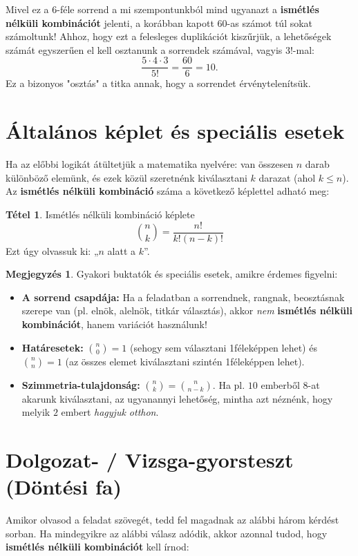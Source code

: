 \documentclass[a4paper,12pt]{article}
\theoremstyle{definition} %
\newtheorem*{theorem}{Tétel}
\newtheorem*{remark}{\mytriangle{bvred} Megjegyzés}
\begin{document}
Mivel ez a $6$-féle sorrend a mi szempontunkból mind ugyanazt a \textbf{ismétlés nélküli kombinációt} jelenti, a korábban kapott $60$-as számot túl sokat számoltunk! Ahhoz, hogy ezt a felesleges duplikációt kiszűrjük, a lehetőségek számát egyszerűen el kell osztanunk a sorrendek számával, vagyis $3!$-mal:
$$\frac{5 \cdot 4 \cdot 3}{5!} = \frac{60}{6} = 10.$$
Ez a bizonyos "osztás" a titka annak, hogy a sorrendet érvénytelenítsük.

\section{Általános képlet és speciális esetek}
Ha az előbbi logikát átültetjük a matematika nyelvére: van összesen $n$ darab különböző elemünk, és ezek közül szeretnénk kiválasztani $k$ darazat (ahol $k \le n$). Az \textbf{ismétlés nélküli kombináció} száma a következő képlettel adható meg:

\begin{theorem}{Ismétlés nélküli kombináció képlete}
$$\binom{n}{k} = \frac{n!}{k!(n-k)!}$$
Ezt úgy olvassuk ki: „$n$ alatt a $k$”.
\end{theorem}

\begin{remark}
Gyakori buktatók és speciális esetek, amikre érdemes figyelni:
\begin{itemize}
    \item \textbf{A sorrend csapdája:} Ha a feladatban a sorrendnek, rangnak, beosztásnak szerepe van (pl. elnök, alelnök, titkár választás), akkor \textit{nem} \textbf{ismétlés nélküli kombinációt}, hanem variációt használunk!
    \item \textbf{Határesetek:} $\binom{n}{0} = 1$ (sehogy sem választani 1féleképpen lehet) és $\binom{n}{n} = 1$ (az összes elemet kiválasztani szintén 1féleképpen lehet).
    \item \textbf{Szimmetria-tulajdonság:} $\binom{n}{k} = \binom{n}{n-k}$. Ha pl. $10$ emberből $8$-at akarunk kiválasztani, az ugyanannyi lehetőség, mintha azt néznénk, hogy melyik $2$ embert \textit{hagyjuk otthon}.
\end{itemize}
\end{remark}

\section{Dolgozat- / Vizsga-gyorsteszt (Döntési fa)}
Amikor olvasod a feladat szövegét, tedd fel magadnak az alábbi három kérdést sorban. Ha mindegyikre az alábbi válasz adódik, akkor azonnal tudod, hogy \textbf{ismétlés nélküli kombinációt} kell írnod:
\end{document}
